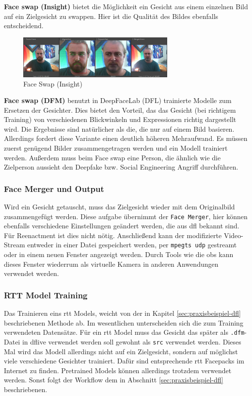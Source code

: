 \textbf{Face swap (Insight)} bietet die Möglichkeit ein Gesicht aus einem einzelnen Bild auf ein Zielgesicht zu swappen.
Hier ist die Qualität des Bildes ebenfalls entscheidend.
\begin{figure}[h]
    \center
    \includegraphics[width=0.7\textwidth]{Bilder/DFLive/Face-swap-ingsight}
    \caption{Face Swap (Insight)}
    \label{fig:dflive-insight-swapping}
\end{figure}

\textbf{Face swap (DFM)} benutzt in DeepFaceLab (DFL) trainierte Modelle zum Ersetzen der Gesichter.
Dies bietet den Vorteil, das das Gesicht (bei richtigem Training) von verschiedenen Blickwinkeln und Expressionen richtig dargestellt wird.
Die Ergebnisse sind natürlicher als die, die nur auf einem Bild basieren.
Allerdings fordert diese Variante einen deutlich höheren Mehraufwand. 
Es müssen zuerst genügend Bilder zusammengetragen werden und ein Modell trainiert werden.
Außerdem muss beim Face swap eine Person, die ähnlich wie die Zielperson aussieht den Deepfake bzw. Social Engineering Angriff durchführen.

\subsubsection*{Face Merger und Output}
Wird ein Gesicht getauscht, muss das Zielgesicht wieder mit dem Originalbild zusammengefügt werden.
Diese aufgabe übernimmt der \texttt{Face Merger}, hier können ebenfalls verschiedene Einstellungen geändert werden, die aus \gls{dfl} bekannt sind.
Für Reenactment ist dies nicht nötig.
Anschließend kann der modifizierte Video-Stream entweder in einer Datei gespeichert werden, per \texttt{mpegts udp} gestreamt oder in einem neuen Fenster angezeigt werden.
Durch Tools wie die \gls{obs} kann dieses Fenster wiederrum als virtuelle Kamera in anderen Anwendungen verwendet werden.

\subsubsection*{RTT Model Training}
Das Trainieren eins \gls{rtt} Models, weicht von der in Kapitel \ref{sec:praxisbeispiel-dfl} beschriebenen Methode ab.
Im wesentlichen unterscheiden sich die zum Training verwendeten Datensätze.
Für ein \gls{rtt} Model muss das Gesicht das später als \texttt{.dfm}-Datei in \gls{dflive} verwendet werden soll gewohnt als \texttt{src} verwendet werden.
Dieses Mal wird das Modell allerdings nicht auf ein Zielgesicht, sondern auf möglichst viele verschiedene Gesichter trainiert.
Dafür sind entsprechende \gls{rtt} Facepacks im Internet zu finden.
Pretrained Models können allerdings trotzdem verwendet werden.
Sonst folgt der Workflow dem in Abschnitt \ref{sec:praxisbeispiel-dfl} beschriebenen.